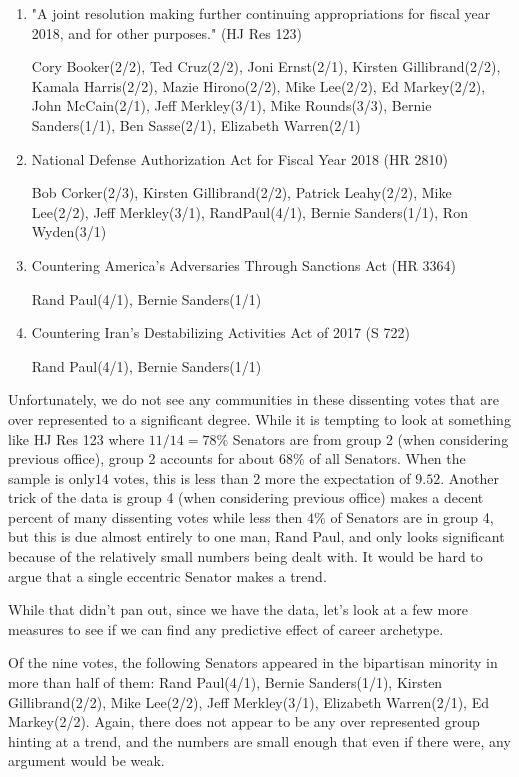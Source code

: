 \documentclass[11pt,twocolumn]{article}
\begin{document}
\begin{enumerate}
\item
"A joint resolution making further continuing appropriations for fiscal year 2018, and for other purposes." (HJ Res 123)

Cory Booker(2/2), Ted Cruz(2/2), Joni Ernst(2/1), Kirsten Gillibrand(2/2), Kamala Harris(2/2), Mazie Hirono(2/2), Mike Lee(2/2), Ed Markey(2/2), John McCain(2/1), Jeff Merkley(3/1), Mike Rounds(3/3), Bernie Sanders(1/1), Ben Sasse(2/1), Elizabeth Warren(2/1)

\item
National Defense Authorization Act for Fiscal Year 2018 (HR 2810)

Bob Corker(2/3), Kirsten Gillibrand(2/2), Patrick Leahy(2/2), Mike Lee(2/2), Jeff Merkley(3/1), RandPaul(4/1), Bernie Sanders(1/1), Ron Wyden(3/1)

\item
Countering America's Adversaries Through Sanctions Act (HR 3364)

Rand Paul(4/1), Bernie Sanders(1/1)

\item
Countering Iran's Destabilizing Activities Act of 2017 (S 722)

Rand Paul(4/1), Bernie Sanders(1/1)
\end{enumerate}

Unfortunately, we do not see any communities in these dissenting votes that are over represented to a significant degree. While it is tempting to look at something like HJ Res 123 where $11/14 = 78\%$ Senators are from group 2 (when considering previous office), group 2 accounts for about $68\%$ of all Senators. When the sample is only$14$ votes, this is less than $2$ more the expectation of $9.52$. Another trick of the data is group 4 (when considering previous office) makes a decent percent of many dissenting votes while less then $4\%$ of Senators are in group 4, but this is due almost entirely to one man, Rand Paul, and only looks significant because of the relatively small numbers being dealt with. It would be hard to argue that a single eccentric Senator makes a trend.

While that didn't pan out, since we have the data, let's look at a few more measures to see if we can find any predictive effect of career archetype.

Of the nine votes, the following Senators appeared in the bipartisan minority in more than half of them:
Rand Paul(4/1), Bernie Sanders(1/1), Kirsten Gillibrand(2/2), Mike Lee(2/2), Jeff Merkley(3/1), Elizabeth Warren(2/1), Ed Markey(2/2). Again, there does not appear to be any over represented group hinting at a trend, and the numbers are small enough that even if there were, any argument would be weak.
\end{document}
